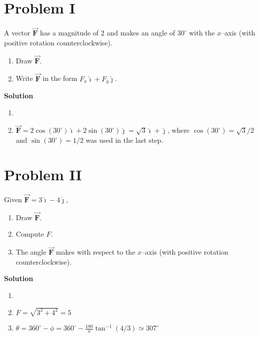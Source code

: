 \documentclass{article}
\newcommand{\ds}[0]{\displaystyle}
\newcommand{\ihat}[0]{\hat{\boldsymbol{\imath}}}
\newcommand{\jhat}[0]{\hat{\boldsymbol{\jmath}}}
\newcommand{\bfvec}[1]{\vec{\mathbf{#1}}}
\begin{document}
\section{Problem I}

A vector $\bfvec{F}$ has a magnitude of $2$ and makes an angle of $30^\circ$ with the $x$--axis (with positive rotation counterclockwise).

\begin{enumerate}

  \item Draw $\bfvec{F}$.

  \item Write $\bfvec{F}$ in the form $F_x\ihat + F_y\jhat$.

\end{enumerate}

\ifsolutions
\textbf{Solution}

    \begin{enumerate}

      \item 

            

      \item $\bfvec{F} = 2\cos(30^\circ)\ihat + 2\sin(30^\circ)\jhat=\sqrt{3}\ihat + \jhat$, where $\cos(30^\circ)=\sqrt{3}/2$ and $\sin(30^\circ)=1/2$ was used in the last step.

    \end{enumerate}
\else


\fi

\section{Problem II}

Given $\bfvec{F}=3\ihat - 4\jhat$,

\begin{enumerate}

  \item Draw $\bfvec{F}$.

  \item Compute $F$.

  \item The angle  $\bfvec{F}$ makes with respect to the $x$--axis (with positive rotation counterclockwise).

\end{enumerate}

\ifsolutions
\textbf{Solution}

    \begin{enumerate}

      \item 

            

      \item $F=\sqrt{3^2+4^2}=5$

      \item $\ds\theta = 360^\circ - \phi = 360^\circ - \frac{180}{\pi}\tan^{-1}(4/3)\simeq 307^\circ$

    \end{enumerate}
\else


\fi
\end{document}
